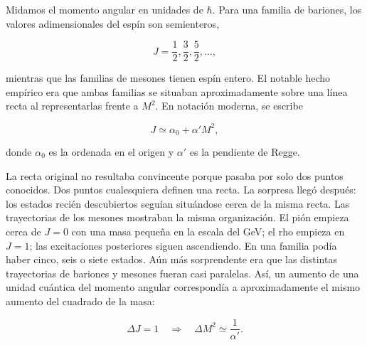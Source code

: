 Midamos el momento angular en unidades de \(\hbar\). Para una familia de bariones, los
valores adimensionales del espín son semienteros,

\begin{equation}
  J=\frac12,\frac32,\frac52,\ldots,
\end{equation}

mientras que las familias de mesones tienen espín entero. El notable hecho empírico era
que ambas familias se situaban aproximadamente sobre una línea recta al representarlas frente a
\(M^2\). En notación moderna, se escribe

\begin{equation}
  J\simeq \alpha_0+\alpha' M^2,
  \label{eq:l01-regge-trajectory}
\end{equation}

donde \(\alpha_0\) es la ordenada en el origen y \(\alpha'\) es la pendiente de Regge.

La recta original no resultaba convincente porque pasaba por solo
dos puntos conocidos. Dos puntos cualesquiera definen una recta. La sorpresa llegó después:
los estados recién descubiertos seguían situándose cerca de la misma recta. Las
trayectorias de los mesones mostraban la misma organización. El pión empieza cerca de \(J=0\) con
una masa pequeña en la escala del GeV; el rho empieza en \(J=1\); las excitaciones posteriores
siguen ascendiendo. En una familia podía haber cinco, seis o siete estados. Aún
más sorprendente era que las distintas trayectorias de bariones y mesones fueran casi
paralelas. Así, un aumento de una unidad cuántica del momento angular correspondía
a aproximadamente el mismo aumento del cuadrado de la masa:

\begin{equation}
  \Delta J=1
  \quad\Longrightarrow\quad
  \Delta M^2\simeq \frac{1}{\alpha'}.
  \label{eq:l01-regge-spacing}
\end{equation}

\begin{classroomqa}
\end{classroomqa}

